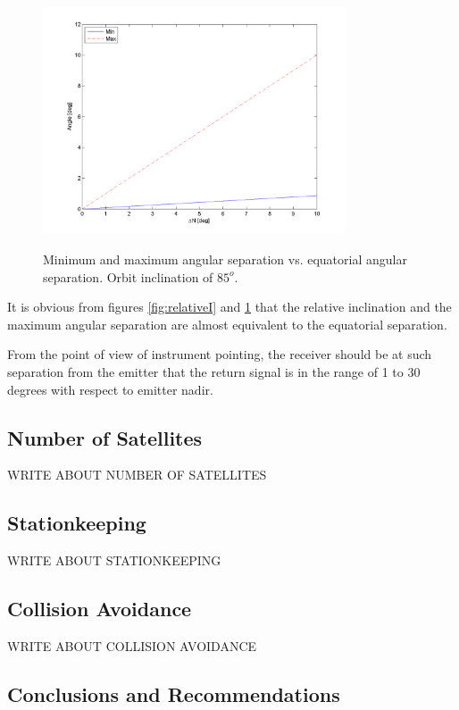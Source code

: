 \documentclass[11pt]{report}
\begin{document}
\begin{figure}[ht!]
\centering
\includegraphics[width=0.8\textwidth, angle=0]{img/angularSeperation.png}
\label{fig:relativeSep}
\caption{Minimum and maximum angular separation vs. equatorial angular separation. Orbit inclination of $85^o$.}
\end{figure}

It is obvious from figures \ref{fig:relativeI} and \ref{fig:relativeSep} that the relative inclination and the maximum angular separation are almost equivalent to the equatorial separation. 

From the point of view of instrument pointing, the receiver should be at such separation from the emitter that the return signal is in the range of 1 to 30 degrees with respect to emitter nadir.
\subsection{Number of Satellites}
\label{mtrSwarmSatNum}
WRITE ABOUT NUMBER OF SATELLITES
\subsection{Stationkeeping}
\label{mtrSwarmStationkeeping}
WRITE ABOUT STATIONKEEPING
\subsection{Collision Avoidance}
\label{mtrSwarmCollision}
WRITE ABOUT COLLISION AVOIDANCE
\subsection{Conclusions and Recommendations}
\label{mtrSwarmRec}
\end{document}
